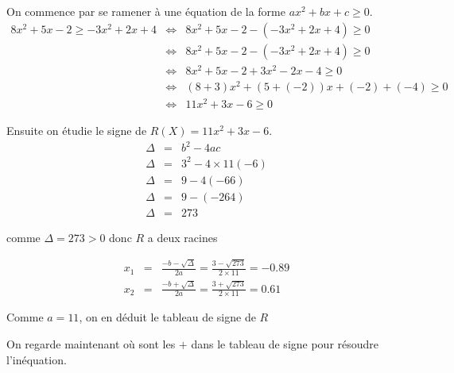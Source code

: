 \documentclass[a4paper,10pt, table]{/media/documents/Cours/Prof/Enseignements/tools/style/classDS}
\begin{document}
\begin{questions}
        \begin{solution}
            On commence par se ramener à une équation de la forme $ax^2 + bx + c \geq 0$.
        \begin{eqnarray*}
            8 x^{  2 } + 5 x - 2 \geq - 3 x^{  2 } + 2 x + 4 & \Leftrightarrow & 8 x^{  2 } + 5 x - 2 - (- 3 x^{  2 } + 2 x + 4) \geq 0 \\
             & \Leftrightarrow & 8 x^{  2 } + 5 x - 2 - ( - 3 x^{  2 } + 2 x + 4 )\geq 0 \\ 
 & \Leftrightarrow & 8 x^{  2 } + 5 x - 2 + 3 x^{  2 } - 2 x - 4\geq 0 \\ 
 & \Leftrightarrow & ( 8 + 3 ) x^{  2 } + ( 5 + ( -2 ) ) x + ( -2 ) + ( -4 )\geq 0 \\ 
 & \Leftrightarrow & 11 x^{  2 } + 3 x - 6\geq 0
        \end{eqnarray*}

        

        Ensuite on étudie le signe de $R(X) = 11 x^{  2 } + 3 x - 6$.
        \begin{eqnarray*}
            \Delta & = & b^2-4ac \\
            \Delta & = & 3^{  2 } - 4 \times 11 ( -6 ) \\ 
\Delta & = & 9 - 4 ( -66 ) \\ 
\Delta & = & 9 - ( -264 ) \\ 
\Delta & = & 273
        \end{eqnarray*}

        
            comme $\Delta = 273 > 0$ donc $R$ a deux racines

            \begin{eqnarray*}
                x_1 & = & \frac{-b - \sqrt{\Delta}}{2a} =  \frac{3 - \sqrt{273}}{2 \times 11} = -0.89 \\
                x_2 & = & \frac{-b + \sqrt{\Delta}}{2a} =  \frac{3 + \sqrt{273}}{2 \times 11} = 0.61
            \end{eqnarray*}


        
        Comme $a = 11$, on en déduit le tableau de signe de $R$
            \begin{center}
            \end{center}
        On regarde maintenant où sont les $+$ dans le tableau de signe pour résoudre l'inéquation.
            


\end{solution}
\end{questions}
\end{document}
